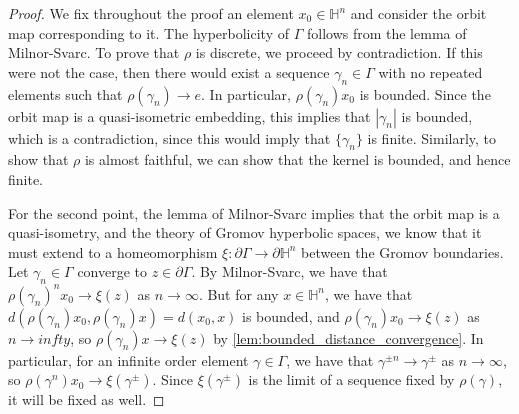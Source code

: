 \documentclass{report}
\begin{document}
\begin{proof}
    We fix throughout the proof an element $x_0 \in \mathbb H^n$ and consider the orbit map corresponding to it.
    The hyperbolicity of $\Gamma$ follows from the lemma of Milnor-Svarc.
    To prove that $\rho$ is discrete, we proceed by contradiction. If this were not the case, then there would exist a sequence $\gamma_n \in \Gamma$ with no repeated elements such that $\rho(\gamma_n) \to e$.
    In particular, $\rho(\gamma_n) x_0$ is bounded.
    Since the orbit map is a quasi-isometric embedding, this implies that $|\gamma_n|$ is bounded, which is a contradiction, since this would imply that $\{\gamma_n\}$ is finite.
    Similarly, to show that $\rho$ is almost faithful, we can show that the kernel is bounded, and hence finite.

    For the second point, the lemma of Milnor-Svarc implies that the orbit map is a quasi-isometry, and the theory of Gromov hyperbolic spaces, we know that it must extend to a homeomorphism $\xi: \partial \Gamma \to \partial \mathbb H^n$ between the Gromov boundaries.
    Let $\gamma_n \in \Gamma$ converge to $z \in \partial \Gamma$. 
    By Milnor-Svarc, we have that $\rho(\gamma_n)^{n} x_0 \to \xi(z)$ as $n \to \infty$.
    But for any $x \in \mathbb H^n$, we have that $d(\rho(\gamma_n) x_0, \rho(\gamma_n) x) = d(x_0, x)$ is bounded, and $\rho(\gamma_n) x_0 \to \xi(z)$ as $n \to infty$, so $\rho(\gamma_n) x \to \xi(z)$ by  \cref{lem:bounded_distance_convergence}.
    In particular, for an infinite order element $\gamma \in \Gamma$, we have that $\gamma^{\pm n} \to \gamma^\pm$ as $n \to \infty$, so $\rho(\gamma^n) x_0 \to \xi(\gamma^\pm)$.
    Since $\xi(\gamma^\pm)$ is the limit of a sequence fixed by $\rho(\gamma)$, it will be fixed as well.
\end{proof}
\end{document}
